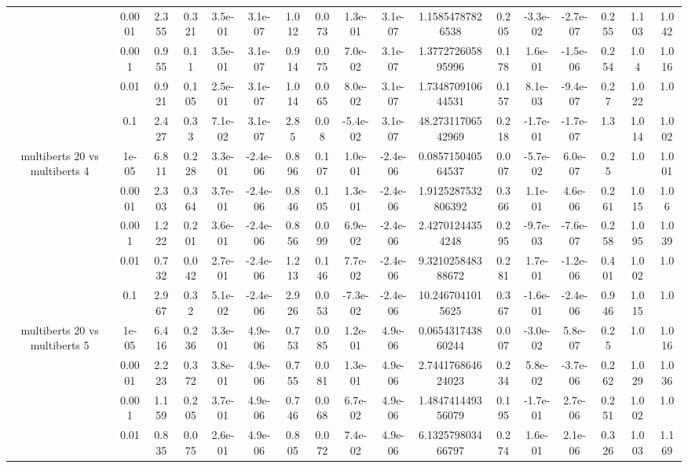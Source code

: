 \begin{tabular}{|c|c|c|c|c|c|c|c|c|c|c|c|c|c|c|c|c|}
 & 0.0001 & 2.355 & 0.321 & 3.5e-01 & 3.1e-07 & 1.012 & 0.073 & 1.3e-01 & 3.1e-07 & 1.15854787826538 & 0.205 & -3.3e-02 & -2.7e-07 & 0.255 & 1.103 & 1.042 \\
 & 0.001 & 0.955 & 0.11 & 3.5e-01 & 3.1e-07 & 0.914 & 0.075 & 7.0e-02 & 3.1e-07 & 1.377272605895996 & 0.178 & 1.6e-01 & -1.5e-06 & 0.254 & 1.04 & 1.016 \\
 & 0.01 & 0.921 & 0.105 & 2.5e-01 & 3.1e-07 & 1.014 & 0.065 & 8.0e-02 & 3.1e-07 & 1.734870910644531 & 0.157 & 8.1e-03 & -9.4e-07 & 0.27 & 1.022 & 1.0 \\
 & 0.1 & 2.427 & 0.33 & 7.1e-02 & 3.1e-07 & 2.85 & 0.08 & -5.4e-02 & 3.1e-07 & 48.27311706542969 & 0.218 & -1.7e-01 & -1.7e-07 & 1.3 & 1.014 & 1.002 \\
\hline
\multirow{5}{*}{multiberts 20 vs multiberts 4} & 1e-05 & 6.811 & 0.228 & 3.3e-01 & -2.4e-06 & 0.896 & 0.107 & 1.0e-01 & -2.4e-06 & 0.085715040564537 & 0.007 & -5.7e-02 & 6.0e-07 & 0.25 & 1.0 & 1.001 \\
 & 0.0001 & 2.303 & 0.364 & 3.7e-01 & -2.4e-06 & 0.846 & 0.105 & 1.3e-01 & -2.4e-06 & 1.9125287532806392 & 0.366 & 1.1e-01 & 4.6e-06 & 0.261 & 1.015 & 1.06 \\
 & 0.001 & 1.222 & 0.201 & 3.6e-01 & -2.4e-06 & 0.856 & 0.099 & 6.9e-02 & -2.4e-06 & 2.42701244354248 & 0.295 & -9.7e-03 & -7.6e-07 & 0.258 & 1.095 & 1.039 \\
 & 0.01 & 0.732 & 0.042 & 2.7e-01 & -2.4e-06 & 1.213 & 0.146 & 7.7e-02 & -2.4e-06 & 9.321025848388672 & 0.281 & 1.7e-01 & -1.2e-06 & 0.401 & 1.002 & 1.0 \\
 & 0.1 & 2.967 & 0.32 & 5.1e-02 & -2.4e-06 & 2.926 & 0.053 & -7.3e-02 & -2.4e-06 & 10.2467041015625 & 0.367 & -1.6e-01 & -2.4e-06 & 0.946 & 1.015 & 1.0 \\
\hline
\multirow{5}{*}{multiberts 20 vs multiberts 5} & 1e-05 & 6.416 & 0.236 & 3.3e-01 & 4.9e-06 & 0.753 & 0.085 & 1.2e-01 & 4.9e-06 & 0.065431743860244 & 0.007 & -3.0e-02 & 5.8e-07 & 0.25 & 1.0 & 1.016 \\
 & 0.0001 & 2.223 & 0.372 & 3.8e-01 & 4.9e-06 & 0.755 & 0.081 & 1.3e-01 & 4.9e-06 & 2.744176864624023 & 0.234 & 5.8e-02 & -3.7e-06 & 0.262 & 1.029 & 1.036 \\
 & 0.001 & 1.159 & 0.205 & 3.7e-01 & 4.9e-06 & 0.746 & 0.068 & 6.7e-02 & 4.9e-06 & 1.484741449356079 & 0.195 & -1.7e-01 & 2.7e-06 & 0.251 & 1.002 & 1.0 \\
 & 0.01 & 0.835 & 0.075 & 2.6e-01 & 4.9e-06 & 0.805 & 0.072 & 7.4e-02 & 4.9e-06 & 6.132579803466797 & 0.274 & 1.6e-01 & 2.1e-06 & 0.326 & 1.003 & 1.169 \\

\end{tabular}
